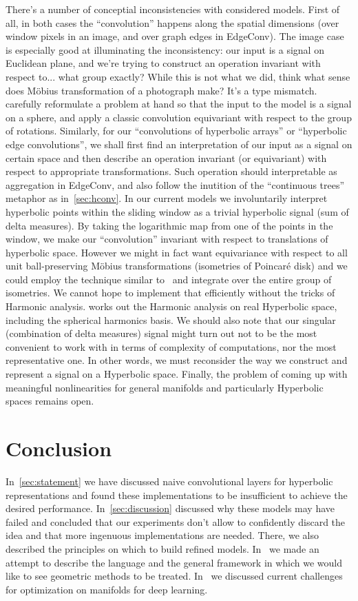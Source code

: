 There's a number of conceptial inconsistencies with considered models.  First
of all, in both cases the ``convolution'' happens along the spatial dimensions
(over window pixels in an image, and over graph edges in EdgeConv). The image
case is especially good at illuminating the inconsistency: our input is a
signal on Euclidean plane, and we're trying to construct an operation invariant
with respect to... what group exactly? While this is not what we did, think
what sense does M\"obius transformation of a photograph make? It's a type
mismatch.
\citet{s2cnn} carefully reformulate a problem at hand so that the input to the
model is a signal on a sphere, and apply a classic convolution equivariant with
respect to the group of rotations. Similarly, for our ``convolutions of
hyperbolic arrays'' or ``hyperbolic edge convolutions'', we shall first find an
interpretation of our input as a signal on certain space and then describe an
operation invariant (or equivariant) with respect to appropriate
transformations. Such operation should interpretable as aggregation in EdgeConv,
and also follow the inutition of the ``continuous trees'' metaphor as
in~\autoref{sec:hconv}. In our current models we involuntarily interpret
hyperbolic points within the sliding window as a trivial hyperbolic signal (sum
of delta measures). By taking the logarithmic map from one of the points in the
window, we make our ``convolution'' invariant with respect to translations of
hyperbolic space. However we might in fact want equivariance with respect to
all unit ball-preserving M\"obius transformations (isometries of Poincar\'e disk)
and we could employ the technique similar to~\cite{s2cnn} and integrate
over the entire group of isometries. We cannot hope to implement that efficiently
without the tricks of Harmonic analysis. \citet{stollharmonic} works out the
Harmonic analysis on real Hyperbolic space, including the spherical harmonics
basis. We should also note that our singular (combination of delta measures)
signal might turn out not to be the most convenient to work with in terms of
complexity of computations, nor the most representative one. In other words, we
must reconsider the way we construct and represent a signal on a Hyperbolic
space. Finally, the problem of coming up with meaningful nonlinearities
for general manifolds and particularly Hyperbolic spaces remains open.

\section{Conclusion}

In~\autoref{sec:statement} we have discussed naive convolutional layers for
hyperbolic representations and found these implementations to be insufficient
to achieve the desired performance. In~\autoref{sec:discussion} discussed why
these models may have failed and concluded that our experiments don't allow to
confidently discard the idea and that more ingenuous implementations are
needed.  There, we also described the principles on which to build refined
models.  In~ we made an attempt to describe the
language and the general framework in which we would like to see geometric
methods to be treated.  In~ we discussed current challenges
for optimization on manifolds for deep learning.

